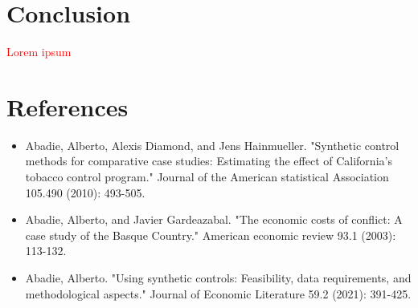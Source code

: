 \documentclass[12pt,a4paper,draft]{article}
\begin{document}
\section{Conclusion}
\textcolor{red}{Lorem ipsum}



\section{References}
\begin{itemize}
    \item Abadie, Alberto, Alexis Diamond, and Jens Hainmueller. "Synthetic control methods for comparative case studies: Estimating the effect of California’s tobacco control program." Journal of the American statistical Association 105.490 (2010): 493-505.
    \item Abadie, Alberto, and Javier Gardeazabal. "The economic costs of conflict: A case study of the Basque Country." American economic review 93.1 (2003): 113-132.
    \item Abadie, Alberto. "Using synthetic controls: Feasibility, data requirements, and methodological aspects." Journal of Economic Literature 59.2 (2021): 391-425.
\end{itemize}
\end{document}

